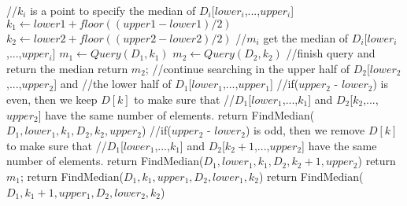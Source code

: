 \documentclass[11pt]{article}
\begin{document}
\begin{CJK*}{UTF8}{gkai}
\begin{algorithm}
\begin{algorithmic}[1]
                \State //$k_i$ is a point to specify the median of $D_i$[$lower_i$,...,$upper_i$]
                \State $k_1\gets lower1+floor((upper1-lower1)/2)$
                \State $k_2\gets lower2+floor((upper2-lower2)/2)$
                \State //$m_i$ get the median of $D_i$[$lower_i$,...,$upper_i$]
                \State $m_1\gets Query(D_1,k_1)$
                \State $m_2\gets Query(D_2,k_2)$
                    \State //finish query and return the median
                        \State return $m_2$;
                    \State //continue searching in the upper half of $D_2$[$lower_2$,...,$upper_2$] and
                    \State //the lower half of $D_1$[$lower_1$,...,$upper_1$]
                    \Else
                        \State //if($upper_2$ - $lower_2$) is even, then we keep $D[k]$ to make sure that
                        \State //$D_1$[$lower_1$,...,$k_1$] and $D_2$[$k_2$,...,$upper_2$] have the same number of elements.
                            \State return FindMedian($D_1, lower_1, k_1, D_2, k_2, upper_2$)
                        \Else
                        \State //if($upper_2$ - $lower_2$) is odd, then we remove $D[k]$ to make sure that
                        \State //$D_1$[$lower_1$,...,$k_1$] and $D_2$[$k_2+1$,...,$upper_2$] have the same number of elements.
                            \State return FindMedian($D_1, lower_1, k_1, D_2, k_2+1, upper_2$)
                        \EndIf
                    \EndIf
                \Else
                        \State return $m_1$;
                    \Else
                            \State return FindMedian($D_1,k_1,upper_1,D_2,lower_1,k_2$)
                        \Else
                            \State return FindMedian($D_1,k_1+1,upper_1,D_2,lower_2,k_2$)
                        \EndIf
                    \EndIf
                \EndIf


\end{algorithmic}
\end{algorithm}
\end{CJK*}
\end{document}
